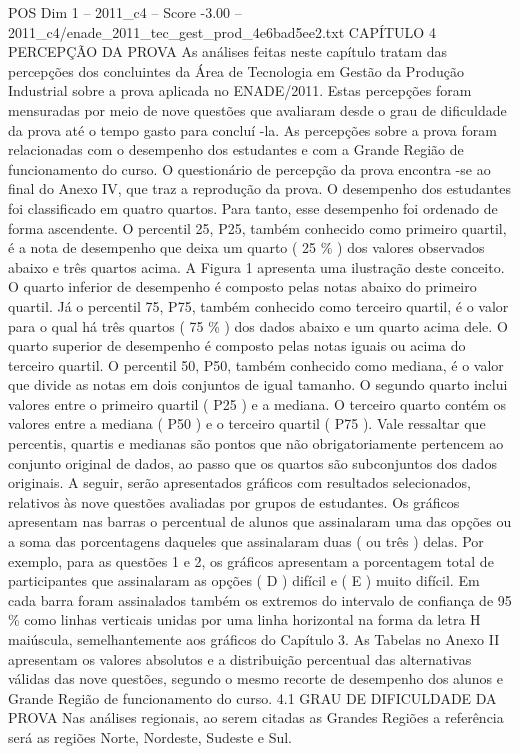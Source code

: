 \begin{textsample}{POS Dim 1 – 2011\_c4 – Score -3.00 – 2011\_c4/enade\_2011\_tec\_gest\_prod\_4e6bad5ee2.txt}  \label{ex:f1_pos_328}
CAPÍTULO 4 PERCEPÇÃO DA PROVA As análises feitas neste capítulo tratam das percepções dos concluintes da Área de Tecnologia em Gestão da Produção Industrial sobre a prova aplicada no ENADE/2011.
Estas percepções foram mensuradas por meio de nove questões que avaliaram desde o grau de dificuldade da prova até o tempo gasto para concluí -la.
As percepções sobre a prova foram relacionadas com o desempenho dos estudantes e com a Grande Região de funcionamento do curso.
O questionário de percepção da prova encontra -se ao final do Anexo IV, que traz a reprodução da prova.
O desempenho dos estudantes foi classificado em quatro quartos.
Para tanto, esse desempenho foi ordenado de forma ascendente.
O percentil 25, P25, também conhecido como primeiro quartil, é a nota de desempenho que deixa um quarto ( 25 \% ) dos valores observados abaixo e três quartos acima.
A Figura 1 apresenta uma ilustração deste conceito.
O quarto inferior de desempenho é composto pelas notas abaixo do primeiro quartil.
Já o percentil 75, P75, também conhecido como terceiro quartil, é o valor para o qual há três quartos ( 75 \% ) dos dados abaixo e um quarto acima dele.
O quarto superior de desempenho é composto pelas notas iguais ou acima do terceiro quartil.
O percentil 50, P50, também conhecido como mediana, é o valor que divide as notas em dois conjuntos de igual tamanho.
O segundo quarto inclui valores entre o primeiro quartil ( P25 ) e a mediana.
O terceiro quarto contém os valores entre a mediana ( P50 ) e o terceiro quartil ( P75 ).
Vale ressaltar que percentis, quartis e medianas são pontos que não obrigatoriamente pertencem ao conjunto original de dados, ao passo que os quartos são subconjuntos dos dados originais.
A seguir, serão apresentados gráficos com resultados selecionados, relativos às nove questões avaliadas por grupos de estudantes.
Os gráficos apresentam nas barras o percentual de alunos que assinalaram uma das opções ou a soma das porcentagens daqueles que assinalaram duas ( ou três ) delas.
Por exemplo, para as questões 1 e 2, os gráficos apresentam a porcentagem total de participantes que assinalaram as opções ( D ) difícil e ( E ) muito difícil.
Em cada barra foram assinalados também os extremos do intervalo de confiança de 95 \% como linhas verticais unidas por uma linha horizontal na forma da letra H maiúscula, semelhantemente aos gráficos do Capítulo 3.
As Tabelas no Anexo II apresentam os valores absolutos e a distribuição percentual das alternativas válidas das nove questões, segundo o mesmo recorte de desempenho dos alunos e Grande Região de funcionamento do curso. 4.1 GRAU DE DIFICULDADE DA PROVA Nas análises regionais, ao serem citadas as Grandes Regiões a referência será as regiões Norte, Nordeste, Sudeste e Sul.

\end{textsample}
